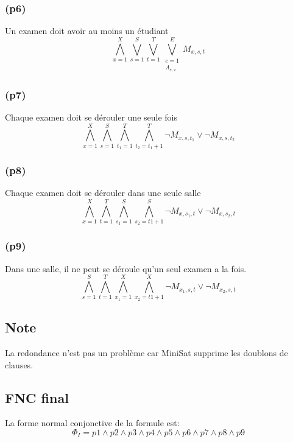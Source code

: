 \documentclass[a4paper,11pt]{article}
\begin{document}
\subsubsection{(p6)}
Un examen doit avoir au moins un étudiant
\begin{displaymath}
\bigwedge\limits_{x=1}^{X}\bigvee\limits_{s=1}^{S}\bigvee\limits_{t=1}^{T}\bigvee\limits_{\substack{e=1 \\ A_{e,x}}}^{E} M_{x, s, t}
\end{displaymath}

\subsubsection{(p7)}
Chaque examen doit se dérouler une seule fois
\begin{displaymath}
\bigwedge\limits_{x=1}^{X}\bigwedge\limits_{s=1}^{S}\bigwedge\limits_{t_{1}=1}^{T}\bigwedge\limits_{t_{2}=t_{1}+1}^{T} \neg M_{x, s, t_{1}} \vee \neg M_{x, s, t_{2}}
\end{displaymath}

\subsubsection{(p8)}
Chaque examen doit se dérouler dans une seule salle
\begin{displaymath}
\bigwedge\limits_{x=1}^{X}\bigwedge\limits_{t=1}^{T}\bigwedge\limits_{s_{1}=1}^{S}\bigwedge\limits_{s_{2}=t1+1}^{S} \neg M_{x, s_{1}, t} \vee \neg M_{x, s_{2}, t}
\end{displaymath}

\subsubsection{(p9)}
Dans une salle, il ne peut se déroule qu'un seul examen a la fois.
\begin{displaymath}
\bigwedge\limits_{s=1}^{S}\bigwedge\limits_{t=1}^{T}\bigwedge\limits_{x_{1}=1}^{X}\bigwedge\limits_{x_{2}=t1+1}^{X} \neg M_{x_{1}, s, t} \vee \neg M_{x_{2}, s, t}
\end{displaymath}

\subsection{Note}
La redondance n'est pas un problème car MiniSat supprime les doublons de clauses.


\subsection{FNC final}
La forme normal conjonctive de la formule est:
\begin{displaymath}
\Phi_{I} = p1 \wedge p2 \wedge p3 \wedge p4 \wedge p5 \wedge p6 \wedge p7 \wedge p8 \wedge p9
\end{displaymath}
\end{document}
